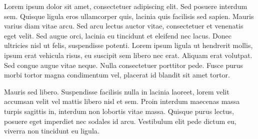 \documentclass[11pt,a4paper,oneside,article]{memoir}
\begin{document}
Lorem ipsum dolor sit amet, consectetuer adipiscing elit. Sed posuere interdum sem. Quisque ligula eros ullamcorper quis, lacinia quis facilisis sed sapien. Mauris varius diam vitae arcu. Sed arcu lectus auctor vitae, consectetuer et venenatis eget velit. Sed augue orci, lacinia eu tincidunt et eleifend nec lacus. Donec ultricies nisl ut felis, suspendisse potenti. Lorem ipsum ligula ut hendrerit mollis, ipsum erat vehicula risus, eu suscipit sem libero nec erat. Aliquam erat volutpat. Sed congue augue vitae neque. Nulla consectetuer porttitor pede. Fusce purus morbi tortor magna condimentum vel, placerat id blandit sit amet tortor.

Mauris sed libero. Suspendisse facilisis nulla in lacinia laoreet, lorem velit accumsan velit vel mattis libero nisl et sem. Proin interdum maecenas massa turpis sagittis in, interdum non lobortis vitae massa. Quisque purus lectus, posuere eget imperdiet nec sodales id arcu. Vestibulum elit pede dictum eu, viverra non tincidunt eu ligula.



\begin{flushleft}
\begin{singlespacing}

\end{singlespacing}
\end{flushleft}

\label{LastPage}~
\end{document}
